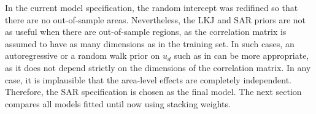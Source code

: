 In the current model specification, the random intercept was redifined so that there are no out-of-sample areas.
Nevertheless, the LKJ and SAR priors are not as useful when there are out-of-sample regions, as the correlation matrix is assumed to have as many dimensions as in the training set.
In such cases, an autoregressive or a random walk prior on $u_d$ such as in \cite{gao_improving_2021} can be more appropriate, as it does not depend strictly on the dimensions of the correlation matrix.
In any case, it is implausible that the area-level effects are completely independent.
Therefore, the SAR specification is chosen as the final model.
The next section compares all models fitted until now using stacking weights.













